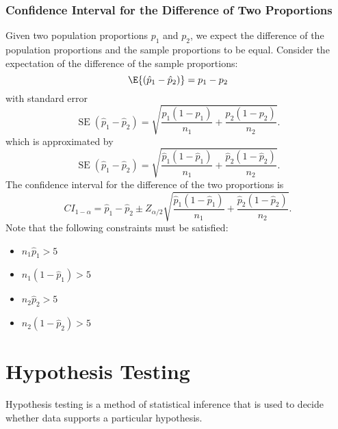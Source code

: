 \documentclass{article}
\begin{document}
\subsubsection{Confidence Interval for the Difference of Two Proportions}
Given two population proportions \(p_1\) and \(p_2\), we expect the difference of the population proportions
and the sample proportions to be equal. Consider the expectation of the difference of the sample proportions:
\begin{equation*}
    \E{\left( \hat{p}_1 - \hat{p}_2 \right)} = p_1 - p_2
\end{equation*}
with standard error
\begin{equation*}
    \operatorname{SE}\left( \hat{p}_1 - \hat{p}_2 \right) = \sqrt{\frac{p_1\left( 1 - p_1 \right)}{n_1} + \frac{p_2\left( 1 - p_2 \right)}{n_2}}.
\end{equation*}
which is approximated by
\begin{equation*}
    \operatorname{SE}\left( \hat{p}_1 - \hat{p}_2 \right) = \sqrt{\frac{\hat{p}_1\left( 1 - \hat{p}_1 \right)}{n_1} + \frac{\hat{p}_2\left( 1 - \hat{p}_2 \right)}{n_2}}.
\end{equation*}
The confidence interval for the difference of the two proportions is
\begin{equation*}
    {CI}_{1-\alpha} = \hat{p}_1 - \hat{p}_2 \pm Z_{\alpha/2} \sqrt{\frac{\hat{p}_1\left( 1 - \hat{p}_1 \right)}{n_1} + \frac{\hat{p}_2\left( 1 - \hat{p}_2 \right)}{n_2}}.
\end{equation*}
Note that the following constraints must be satisfied:
\begin{itemize}
    \item \(n_1 \hat{p}_1 > 5\)
    \item \(n_1 \left( 1 - \hat{p}_1 \right) > 5\)
    \item \(n_2 \hat{p}_2 > 5\)
    \item \(n_2 \left( 1 - \hat{p}_2 \right) > 5\)
\end{itemize}
\section{Hypothesis Testing}
Hypothesis testing is a method of statistical inference that is used to decide whether
data supports a particular hypothesis.
\end{document}
